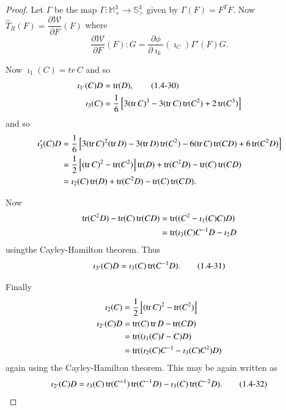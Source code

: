 \begin{proof}
Let $\Gamma$ be the map $\Gamma : \mathbb{M}^{3}_{+} \to
  \mathbb{S}^{3}_{>} $ given by $\Gamma (F) = F^{T}F$. Now
  $\hat{T}_{R}(F) = \dfrac{\partial \mathcal{W}}{\partial F} (F)$ where  
  $$
  \frac{\partial \mathcal{W}}{\partial F} (F) : G = \frac{\partial
    \phi}{\partial \imath_{k}}(\imath_{C})\Gamma' (F) G. 
  $$

  Now $\imath_{1}(C) = tr~ C$ and so 
  \begin{align*}
    \imath_{1'}(C)D & = \operatorname{tr} (D), \tag{1.4-30}\label{eq1.4-30}\\
  \imath_{3}(C) & = \frac{1}{6} \left[3 (\operatorname{tr} C)^{3} - 3 (\operatorname{tr} C) \operatorname{tr}(C^{2})
    + 2 \operatorname{tr} (C^{3})\right]
  \end{align*}
  and so 
  \begin{align*}
    \imath_{3}'(C)D & = \frac{1}{6} \left[3 (\operatorname{tr} C)^{2} (\operatorname{tr} D) - 3(\operatorname{tr}
      D) \operatorname{tr} (C^{2}) - 6 (\operatorname{tr} C) \operatorname{tr}(CD) + 6 \operatorname{tr} (C^{2} D)\right]\\ 
    & = \frac{1}{2} \left[(\operatorname{tr} C)^{2} - \operatorname{tr}(C^{2})\right] \operatorname{tr} (D) +
    \operatorname{tr} (C^{2}D) - \operatorname{tr} (C) \operatorname{tr} (CD)\\ 
    & = \imath_{2} (C) \operatorname{tr} (D) + \operatorname{tr} (C^{2}D) - \operatorname{tr} (C) \operatorname{tr}(CD).
  \end{align*}

  Now
  \begin{align*}
    \operatorname{tr} (C^{2}D) - \operatorname{tr} (C) \operatorname{tr}(CD) & = \operatorname{tr}((C^{2} - \imath_{1} (C)C)D)\\
    & = \operatorname{tr} (\imath_{3} (C)C^{-1}D - \imath_{2}D
  \end{align*}
  using\pageoriginale the Cayley-Hamilton theorem. Thus 
  \begin{equation*}
    \imath_{3'}(C) D = \imath_{3}(C) \operatorname{tr}(C^{-1}D). \tag{1.4-31}\label{eq1.4-31}
  \end{equation*}

  Finally
  \begin{align*}
    \imath_{2}(C) & = \frac{1}{2} \left[(\operatorname{tr} C)^{2} - \operatorname{tr} (C^{2})\right]\\
    \imath_{2'}(C)D & = \operatorname{tr} (C) \operatorname{tr} D - \operatorname{tr} (CD)\\
    & = \operatorname{tr} ((\imath_{1}(C) I - C) D)\\
    & = \operatorname{tr} ((\imath_{2}(C) C^{-1} - \imath_{3} (C) C^{2})D)
  \end{align*}
  again using the Cayley-Hamilton theorem. This may be again written as 
  \begin{equation*}
    \imath_{2'}(C)D = \imath_{3}(C) \operatorname{tr} (C^{=1}) \operatorname{tr} (C^{-1}D) -
    \imath_{3}(C) \operatorname{tr} 
    (C^{-2}D). \tag{1.4-32}\label{eq1.4-32} 
  \end{equation*}


\end{proof}
